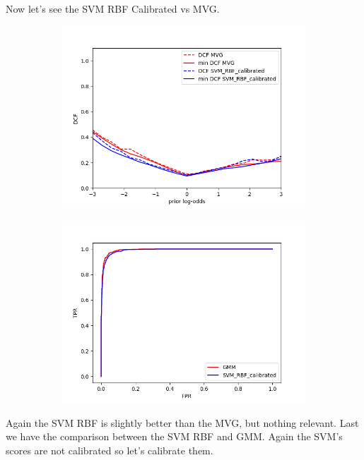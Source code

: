 \documentclass[english]{report}
\begin{document}
 Now let's see the SVM RBF Calibrated vs MVG\@.
\begin{figure}[H]
    \begin{subfigure}{0.5\textwidth}
        \includegraphics[scale=0.5]{../../images/comparison/validation/DCF_MVG&SVM_RBF_calibrated}
    \end{subfigure}
    \begin{subfigure}{0.5\textwidth}
        \includegraphics[scale=0.5]{../../images/comparison/validation/ROC_GMM&SVM_RBF_calibrated}
    \end{subfigure}
    \label{fig:SVMcalibvsMVG}
\end{figure}
Again the SVM RBF is slightly better than the MVG, but nothing relevant.
Last we have the comparison between the SVM RBF and GMM. Again the SVM's scores are not calibrated so let's calibrate them.
\end{document}
